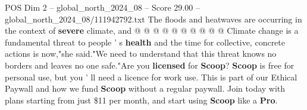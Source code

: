 \begin{textsample}{POS Dim 2 – global\_north\_2024\_08 – Score 29.00 – global\_north\_2024\_08/111942792.txt}
The floods and heatwaves are occurring in the context of \textbf{severe} climate, and @ @ @ @ @ @ @ @ @ @ Climate change is a fundamental threat to people ' s \textbf{health} and the time for collective, concrete actions is now,"she said."We need to understand that this threat knows no borders and leaves no one safe."Are you \textbf{licensed} for \textbf{Scoop}? \textbf{Scoop} is free for personal use, but you ' ll need a licence for work use.
This is part of our Ethical Paywall and how we fund \textbf{Scoop} without a regular paywall.
Join today with plans starting from just \$11 per month, and start using \textbf{Scoop} like a \textbf{Pro}.

\end{textsample}
